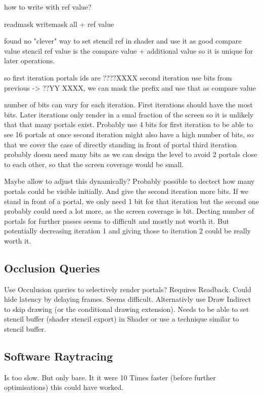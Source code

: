 how to write with ref value?

readmask
writemask all + ref value

found no "clever" way to set stencil ref in shader and use it as good compare value
stencil ref value is the compare value + additional value so it is unique for later operations.

so first iteration portals ids are ????XXXX
second iteration use bits from previous -> ??YY XXXX, we can mask the prefix and use that as compare value

number of bits can vary for each iteration. First iterations should have the most bits. Later iterations only render in a smal fraction of the screen so it is unlikely that that many portals exist.
Probably use 4 bits for first iteration to be able to see 16 portals at once
second iteration might also have a high number of bits, so that we cover the case of directly standing in front of portal
third iteration probably doesn need many bits as we can design the level to avoid 2 portals close to each other, so that the screen coverage would be small.

Maybe allow to adjust this dynamically? Probably possible to dectect how many portals could be visible initially. And give the second iteration more bits. If we stand in front of a portal, we only need 1 bit for that iteration but the second one probably could need a lot more, as the screen coverage is bit.
Decting number of portals for further passes seems to difficult and mostly not worth it. But potentially decreasing iteration 1 and giving those to iteration 2 could be really worth it.






\subsection{Occlusion Queries}
Use Occulusion queries to selectively render portals? Requires Readback. Could hide latency by delaying frames. Seems difficult.
Alternativly use Draw Indirect to skip drawing (or the conditional drawing extension). Needs to be able to set stencil buffer (shader stencil export) in Shader or use a technique similar to stencil buffer.


\subsection{Software Raytracing}
Is too slow. But only bare. It it were 10 Times faster (before further optimisations) this could have worked.


